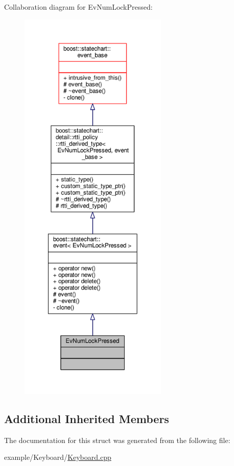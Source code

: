Collaboration diagram for Ev\+Num\+Lock\+Pressed\+:
\nopagebreak
\begin{figure}[H]
\begin{center}
\leavevmode
\includegraphics[height=550pt]{struct_ev_num_lock_pressed__coll__graph}
\end{center}
\end{figure}
\subsection*{Additional Inherited Members}


The documentation for this struct was generated from the following file\+:\begin{DoxyCompactItemize}
\item 
example/\+Keyboard/\mbox{\hyperlink{_keyboard_8cpp}{Keyboard.\+cpp}}\end{DoxyCompactItemize}
